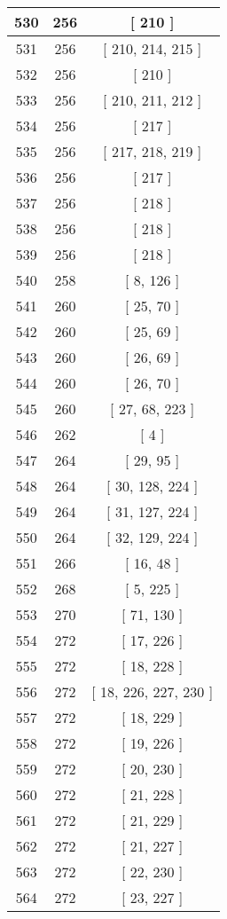 \begin{center}
\begin{longtable}[H]{|| c c c ||}
\hline
530 & 256 & [ 210 ] \\ 
\hline
531 & 256 & [ 210, 214, 215 ] \\ 
\hline
532 & 256 & [ 210 ] \\ 
\hline
533 & 256 & [ 210, 211, 212 ] \\ 
\hline
534 & 256 & [ 217 ] \\ 
\hline
535 & 256 & [ 217, 218, 219 ] \\ 
\hline
536 & 256 & [ 217 ] \\ 
\hline
537 & 256 & [ 218 ] \\ 
\hline
538 & 256 & [ 218 ] \\ 
\hline
539 & 256 & [ 218 ] \\ 
\hline
540 & 258 & [ 8, 126 ] \\ 
\hline
541 & 260 & [ 25, 70 ] \\ 
\hline
542 & 260 & [ 25, 69 ] \\ 
\hline
543 & 260 & [ 26, 69 ] \\ 
\hline
544 & 260 & [ 26, 70 ] \\ 
\hline
545 & 260 & [ 27, 68, 223 ] \\ 
\hline
546 & 262 & [ 4 ] \\ 
\hline
547 & 264 & [ 29, 95 ] \\ 
\hline
548 & 264 & [ 30, 128, 224 ] \\ 
\hline
549 & 264 & [ 31, 127, 224 ] \\ 
\hline
550 & 264 & [ 32, 129, 224 ] \\ 
\hline
551 & 266 & [ 16, 48 ] \\ 
\hline
552 & 268 & [ 5, 225 ] \\ 
\hline
553 & 270 & [ 71, 130 ] \\ 
\hline
554 & 272 & [ 17, 226 ] \\ 
\hline
555 & 272 & [ 18, 228 ] \\ 
\hline
556 & 272 & [ 18, 226, 227, 230 ] \\ 
\hline
557 & 272 & [ 18, 229 ] \\ 
\hline
558 & 272 & [ 19, 226 ] \\ 
\hline
559 & 272 & [ 20, 230 ] \\ 
\hline
560 & 272 & [ 21, 228 ] \\ 
\hline
561 & 272 & [ 21, 229 ] \\ 
\hline
562 & 272 & [ 21, 227 ] \\ 
\hline
563 & 272 & [ 22, 230 ] \\ 
\hline
564 & 272 & [ 23, 227 ] \\ 

\end{longtable}
\end{center}
